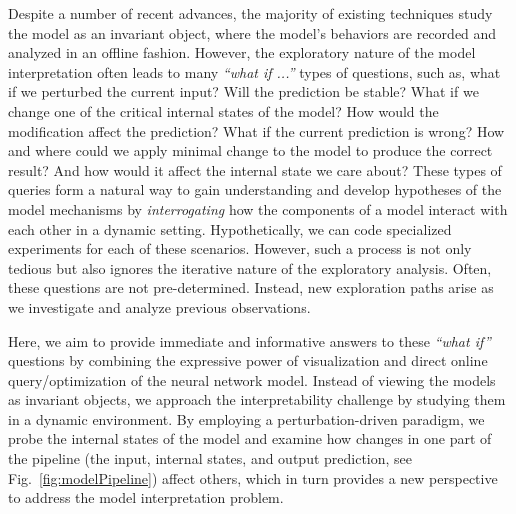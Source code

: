 Despite a number of recent advances, the majority of existing techniques study the model as an invariant object, where the model's behaviors are recorded and analyzed in an offline fashion.
%
However, the exploratory nature of the model interpretation often leads to many \emph{``what if ...''} types of questions, 
such as, what if we perturbed the current input?
Will the prediction be stable?
What if we change one of the critical internal states of the model? 
How would the modification affect the prediction? 
What if the current prediction is wrong? 
How and where could we apply minimal change to the model to produce the correct result? And how would it affect the internal state we care about? These types of queries form a natural way to gain understanding and develop hypotheses of the model mechanisms by \emph{interrogating} how the components of a model interact with each other in a dynamic setting.
Hypothetically, we can code specialized experiments for each of these scenarios.
However, such a process is not only tedious but also ignores the iterative nature of the exploratory analysis. Often, these questions are not pre-determined.
Instead, new exploration paths arise as we investigate and analyze previous observations.

Here, we aim to provide immediate and informative answers to these \emph{``what if''} questions by combining the expressive power of visualization and direct online query/optimization of the neural network model. Instead of viewing the models as invariant objects, we approach the interpretability challenge by studying them in a dynamic environment. By employing a perturbation-driven paradigm, we probe the internal states of the model and examine how changes in one part of the pipeline (the input, internal states, and output prediction, see Fig.~\ref{fig:modelPipeline}) affect others, which in turn provides a new perspective to address the model interpretation problem.

